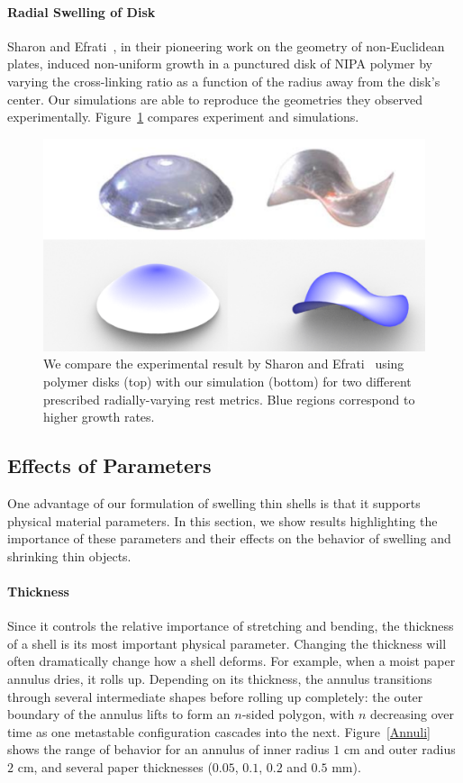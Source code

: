 \documentclass[timestamp,acmtog]{acmart}
\begin{document}
\paragraph{Radial Swelling of Disk}
Sharon and Efrati~, in their pioneering work on the geometry of non-Euclidean plates, induced non-uniform growth in a punctured disk of NIPA polymer by varying the cross-linking ratio as a function of the radius away from the disk's center. Our simulations are able to reproduce the geometries they observed experimentally. Figure~\ref{SwellingDisc} compares experiment and simulations.

\begin{figure}[h]
  \centering
  \includegraphics[width=\linewidth]{SwellingDisc.png}
  \caption{We compare the experimental result by Sharon and Efrati~ using polymer disks (top) with our simulation (bottom) for two different prescribed radially-varying rest metrics. Blue regions correspond to higher growth rates. }
  \label{SwellingDisc}
\end{figure}

\subsection{Effects of Parameters}
One advantage of our formulation of swelling thin shells is that it supports physical material parameters. In this section, we show results highlighting the importance of these parameters and their effects on the behavior of swelling and shrinking thin objects.

\paragraph{Thickness}
Since it controls the relative importance of stretching and bending, the thickness of a shell is its most important physical parameter. Changing the thickness will often dramatically change how a shell deforms. For example, when a moist paper annulus dries, it rolls up. Depending on its thickness, the annulus transitions through several intermediate shapes before rolling up completely: the outer boundary of the annulus lifts to form an $n$-sided polygon, with $n$ decreasing over time as one metastable configuration cascades into the next. Figure~\ref{Annuli} shows the range of behavior for an annulus of inner radius $1$ cm and outer radius $2$ cm, and several paper thicknesses ($0.05$, $0.1$, $0.2$ and $0.5$ mm).
\end{document}
